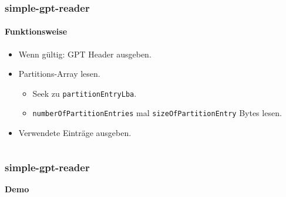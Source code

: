 \begin{frame}
    \frametitle{simple-gpt-reader}
    \framesubtitle{Funktionsweise}
    
    \begin{itemize}
        \item Wenn gültig: GPT Header ausgeben.
        
        \pause
        \item Partitions-Array lesen.
        \begin{itemize}
            \item Seek zu \texttt{partitionEntryLba}.
            \item  \texttt{numberOfPartitionEntries} mal \texttt{sizeOfPartitionEntry} Bytes lesen.
        \end{itemize}

        \pause
        \item Verwendete Einträge ausgeben.
        \inputminted[firstline=3, lastline=5, breaklines, frame=single]{c++}{content/code/simple-gpt-reader/GptPartitionEntry.cpp}
    \end{itemize}
\end{frame}

\begin{frame}
    \frametitle{simple-gpt-reader}    

    \begin{center}
        \vspace{2.2cm}
        \Huge{\textbf{Demo}}
    \end{center}
\end{frame}

